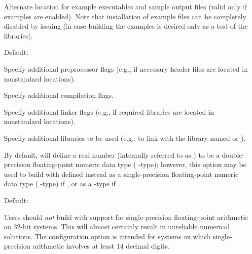\begin{config}
\item {}

  Alternate location for example executables and sample output files (valid only if
  examples are enabled). Note that installation of example files can be completely disabled
  by issuing  (in case building the examples is desired only as a test of
  the {\sundials} libraries).

  Default: 

\item {}

  Specify additional {\C} preprocessor flags 
  (e.g.,  if necessary header files are located in
   nonstandard locations).

\item {}

  Specify additional {\C} compilation flags.

\item {}

  Specify additional linker flags (e.g.,  if
  required libraries are located in nonstandard locations).

\item {}

  Specify additional libraries to be used (e.g.,  to
  link with the library named  or ).

\item {}

  By default, {\sundials} will define a real number (internally referred to as
  ) to be a double-precision floating-point numeric data type
  ( {\C}-type); however, this option may be used to build {\sundials}
  with  defined instead as a single-precision floating-point
  numeric data type ( {\C}-type) if , or as a
   {\C}-type if .

  Default: 

  {\warn}Users should {\em not} build {\sundials} with support for
  single-precision floating-point arithmetic on 32-bit systems.
  This will almost certainly result in unreliable numerical solutions.
  The configuration option  is intended for
  systems on which single-precision arithmetic involves at least 14 decimal
  digits.

\end{config}


